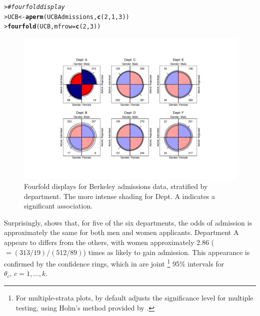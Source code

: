 \documentclass[10pt,krantz2]{krantz}\usepackage[]{graphicx}\usepackage[]{color}
\makeatletter
\newcommand{\hlnum}[1]{\textcolor[rgb]{0.686,0.059,0.569}{#1}}%
\newcommand{\hlcom}[1]{\textcolor[rgb]{0.678,0.584,0.686}{\textit{#1}}}%
\newcommand{\hlstd}[1]{\textcolor[rgb]{0.345,0.345,0.345}{#1}}%
\newcommand{\hlkwb}[1]{\textcolor[rgb]{0.69,0.353,0.396}{#1}}%
\newcommand{\hlkwc}[1]{\textcolor[rgb]{0.333,0.667,0.333}{#1}}%
\newcommand{\hlkwd}[1]{\textcolor[rgb]{0.737,0.353,0.396}{\textbf{#1}}}%
\newenvironment{kframe}{%
 \def\at@end@of@kframe{}%
 \ifinner\ifhmode%
  \def\at@end@of@kframe{\end{minipage}}%
  \begin{minipage}{\columnwidth}%
 \fi\fi%
 \def\FrameCommand##1{\hskip\@totalleftmargin \hskip-\fboxsep
 \colorbox{shadecolor}{##1}\hskip-\fboxsep
     \hskip-\linewidth \hskip-\@totalleftmargin \hskip\columnwidth}%
 \MakeFramed {\advance\hsize-\width
   \@totalleftmargin\z@ \linewidth\hsize
   \@setminipage}}%
 {\par\unskip\endMakeFramed%
 \at@end@of@kframe}
\newenvironment{knitrout}{}{} %
\renewenvironment{knitrout}{\small\renewcommand{\baselinestretch}{.85}}{} %
\makeatother
\begin{document}
\begin{knitrout}
\color{fgcolor}\begin{kframe}
\begin{alltt}
\hlstd{> }\hlcom{# fourfold display}
\hlstd{> }\hlstd{UCB} \hlkwb{<-} \hlkwd{aperm}\hlstd{(UCBAdmissions,} \hlkwd{c}\hlstd{(}\hlnum{2}\hlstd{,} \hlnum{1}\hlstd{,} \hlnum{3}\hlstd{))}
\hlstd{> }\hlkwd{fourfold}\hlstd{(UCB,} \hlkwc{mfrow} \hlstd{=} \hlkwd{c}\hlstd{(}\hlnum{2}\hlstd{,} \hlnum{3}\hlstd{))}
\end{alltt}
\end{kframe}\begin{figure}[!htbp]

\centerline{\includegraphics[width=.95\textwidth,trim=80 50 80 50]{ch04/fig/berk-fourfold4-1} }

\caption[Fourfold displays for Berkeley admissions data, stratified by department]{Fourfold displays for Berkeley admissions data, stratified by department. The more intense shading for Dept. A indicates a significant association.\label{fig:berk-fourfold4}}
\end{figure}


\end{knitrout}

Surprisingly,  shows that, for five of the
six departments, the odds of admission is approximately the same for
both men and women applicants.  Department A appears to differs from
the others, with women approximately 2.86 (\(=  ( 313/19 )  /
(512/89)\)) times as likely to gain admission.  This appearance is
confirmed by the confidence rings, which in 
are joint%
\footnote{
For multiple-strata plots,  by default adjusts the
significance level for multiple testing, using Holm's
\citeyearpar{Holm:1979} method
provided by .
}
95\% intervals for \(\theta_c ,  \,  c = 1, \dots ,
k\).
\end{document}
